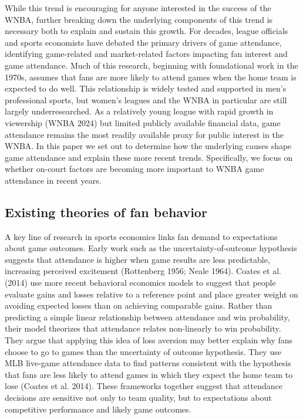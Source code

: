 \documentclass[
  letterpaper,
  DIV=11,
  numbers=noendperiod]{scrartcl}
\begin{document}
While this trend is encouraging for anyone interested in the success of
the WNBA, further breaking down the underlying components of this trend
is necessary both to explain and sustain this growth. For decades,
league officials and sports economists have debated the primary drivers
of game attendance, identifying game-related and market-related factors
impacting fan interest and game attendance. Much of this research,
beginning with foundational work in the 1970s, assumes that fans are
more likely to attend games when the home team is expected to do well.
This relationship is widely tested and supported in men's professional
sports, but women's leagues and the WNBA in particular are still largely
underresearched. As a relatively young league with rapid growth in
viewership (WNBA 2024) but limited publicly available financial data,
game attendance remains the most readily available proxy for public
interest in the WNBA. In this paper we set out to determine how the
underlying causes shape game attendance and explain these more recent
trends. Specifically, we focus on whether on-court factors are becoming
more important to WNBA game attendance in recent years.

\subsection{Existing theories of fan
behavior}\label{existing-theories-of-fan-behavior}

A key line of research in sports economics links fan demand to
expectations about game outcomes. Early work such as the
uncertainty-of-outcome hypothesis suggests that attendance is higher
when game results are less predictable, increasing perceived excitement
(Rottenberg 1956; Neale 1964). Coates et al. (2014) use more recent
behavioral economics models to suggest that people evaluate gains and
losses relative to a reference point and place greater weight on
avoiding expected losses than on achieving comparable gains. Rather than
predicting a simple linear relationship between attendance and win
probability, their model theorizes that attendance relates non-linearly
to win probability. They argue that applying this idea of loss aversion
may better explain why fans choose to go to games than the uncertainty
of outcome hypothesis. They use MLB live-game attendance data to find
patterns consistent with the hypothesis that fans are less likely to
attend games in which they expect the home team to lose (Coates et al.
2014). These frameworks together suggest that attendance decisions are
sensitive not only to team quality, but to expectations about
competitive performance and likely game outcomes.
\end{document}
